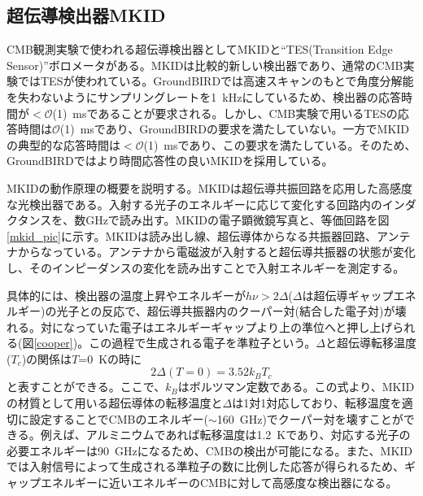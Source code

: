 \subsection{超伝導検出器MKID}
\label{MKID}
CMB観測実験で使われる超伝導検出器としてMKIDと``TES(Transition Edge Sensor)\cite{TES_res}''ボロメータがある。MKIDは比較的新しい検出器であり、通常のCMB実験ではTESが使われている。GroundBIRDでは高速スキャンのもとで角度分解能を失わないようにサンプリングレートを\SI{1}{kHz}にしているため、検出器の応答時間が$< \mathcal{O}$(1)~msであることが要求される。しかし、CMB実験で用いるTESの応答時間は$\mathcal{O}$(1)~msであり\cite{TES_res}、GroundBIRDの要求を満たしていない。一方でMKIDの典型的な応答時間は$< \mathcal{O}$(1)~msであり\cite{MKID_res}、この要求を満たしている。そのため、GroundBIRDではより時間応答性の良いMKIDを採用している。

MKIDの動作原理の概要を説明する。MKIDは超伝導共振回路を応用した高感度な光検出器である。入射する光子のエネルギーに応じて変化する回路内のインダクタンスを、数GHzで読み出す。MKIDの電子顕微鏡写真\cite{MKID_pic}と、等価回路を図\ref{mkid_pic}に示す。MKIDは読み出し線、超伝導体からなる共振器回路、アンテナからなっている。アンテナから電磁波が入射すると超伝導共振器の状態が変化し、そのインピーダンスの変化を読み出すことで入射エネルギーを測定する。

具体的には、検出器の温度上昇やエネルギーが$h\nu > 2\Delta$($\Delta$は超伝導ギャップエネルギー)の光子との反応で、超伝導共振器内のクーパー対(結合した電子対)が壊れる。対になっていた電子はエネルギーギャップより上の準位へと押し上げられる(図\ref{cooper})。この過程で生成される電子を準粒子という。$\Delta$と超伝導転移温度($T_{c}$)の関係は$T$=\SI{0}{K}の時に
\begin{equation}
  2\Delta(T=0) = 3.52k_{B}T_{c}
\end{equation}
と表すことができる\cite{bcs}。ここで、$k_{B}$はボルツマン定数である。この式より、MKIDの材質として用いる超伝導体の転移温度と$\Delta$は1対1対応しており、転移温度を適切に設定することでCMBのエネルギー($\sim$\SI{160}{GHz})でクーパー対を壊すことができる。例えば、アルミニウムであれば転移温度は\SI{1.2}{K}であり、対応する光子の必要エネルギーは\SI{90}{GHz}になるため、CMBの検出が可能になる。また、MKIDでは入射信号によって生成される準粒子の数に比例した応答が得られるため、ギャップエネルギーに近いエネルギーのCMBに対して高感度な検出器になる。

